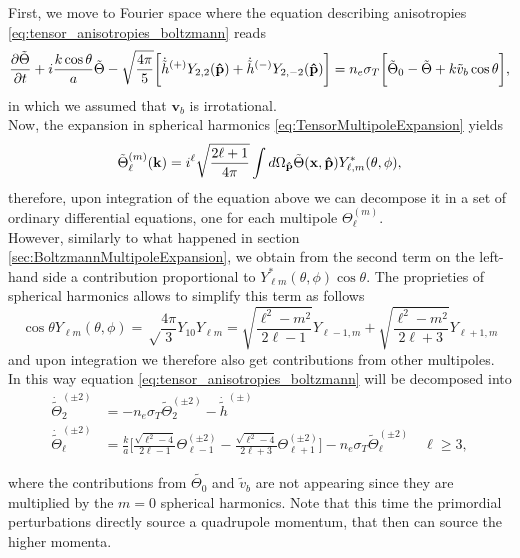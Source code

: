 First, we move to Fourier space where the equation describing anisotropies \eqref{eq:tensor_anisotropies_boltzmann} reads
$$\frac{\partial\tilde \Theta}{\partial t}+i\frac{k\cos\theta}{a} \tilde\Theta-\sqrt{\frac{4\pi}{5}}\bigg[\dot{\tilde{h}}^{(+)}Y_{2,2}(\mathbf{\hat{p}})+\dot{\tilde{h}}^{(-)}Y_{2,-2}(\mathbf{\hat{p}})\bigg]=n_{e}\sigma_T\bigg[\tilde\Theta_0-\tilde\Theta+k\tilde v_{b}\cos\theta\bigg],$$ in which we assumed that $\mathbf{v}_b$ is irrotational. \\Now, the expansion in spherical harmonics \eqref{eq:TensorMultipoleExpansion} yields 
$$\tilde{\Theta}_{\ell}^{(m)}(\mathbf{k})=i^\ell\sqrt{\frac{2\ell+1}{4\pi}}\int d\Omega_{\mathbf{\hat{p}}}\tilde\Theta(\mathbf{x},\mathbf{\hat{p}})Y_{\ell,m}^*(\theta,\phi),$$
therefore, upon integration of the equation above we can decompose it in a set of ordinary differential equations, one for each multipole $\Theta_\ell^{(m)}$.\\
However, similarly to what happened in section \ref{sec:BoltzmannMultipoleExpansion}, we obtain from the second term on the left-hand side a contribution proportional to $Y^*_{\ell m}(\theta,\phi)\cos\theta$. The proprieties of spherical harmonics allows to simplify this term as follows
$$
\cos\theta Y_{\ell m}(\theta,\phi)=\sqrt\frac{4\pi}{3}Y_{10}Y_{\ell m}=\sqrt{\frac{\ell^2-m^2}{2\ell-1}}Y_{\ell-1,m}+\sqrt{\frac{\ell^2-m^2}{2\ell+3}}Y_{\ell+1,m}
$$  and upon integration we therefore also get contributions from other multipoles.\\In this way equation \eqref{eq:tensor_anisotropies_boltzmann}
will be decomposed into
\begin{subequations}
    \begin{align}
    \dot{\tilde\Theta}_2^{(\pm2)}&=-n_e\sigma_T\tilde\Theta_{2}^{(\pm2)}-\dot{\tilde h}^{(\pm)}\quad \\
    \dot{\tilde\Theta}_\ell^{(\pm2)}&=\frac{k}{a}\bigg[\frac{\sqrt{\ell^2-4}}{2\ell-1}\Theta_{\ell-1}^{(\pm2)}-\frac{\sqrt{\ell^2-4}}{2\ell+3}\Theta_{\ell+1}^{(\pm2)}\bigg]-n_e\sigma_T\tilde\Theta_{\ell}^{(\pm2)}\quad \ell\geq3,
\end{align}
\end{subequations}

where the contributions from $\tilde{\Theta_0}$ and $\tilde v_b$ are not appearing since they are multiplied by the $m=0$ spherical harmonics. Note that this time the primordial perturbations directly source a quadrupole momentum, that then can source the higher momenta.

